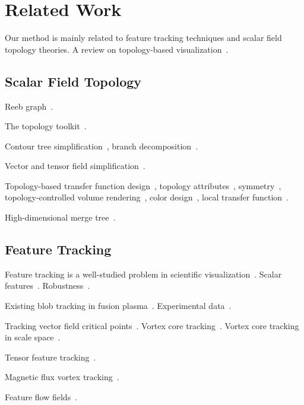 \section{Related Work}
\label{sec:related}

Our method is mainly related to feature tracking techniques and scalar field topology theories.  A review on topology-based visualization~\cite{HeineLHIFSHG16}. 



\subsection{Scalar Field Topology}

Reeb graph~\cite{Reeb1946}.  

The topology toolkit~\cite{TiernyFLGM18}.  

Contour tree simplification~\cite{CarrSP04, KreveldOBPS97}, branch decomposition~\cite{Pascucci2004}.

Vector and tensor field simplification~\cite{TricocheSH00, TricocheSH01a, TricocheSHC01}.  

Topology-based transfer function design~\cite{FujishiroAT99}, topology attributes~\cite{TakeshimaTFN04}, symmetry~\cite{ThomasN11}, topology-controlled volume rendering~\cite{WeberDCPH07}, color design~\cite{ZhouT09}, local transfer function~\cite{GuoY13}.  

High-dimensional merge tree~\cite{OesterlingHWMS17}. 




\subsection{Feature Tracking}

Feature tracking is a well-studied problem in scientific visualization~\cite{PostVHLD2003}.  Scalar features~\cite{SilverW98}.  Robustness~\cite{SkrabaW14}.  

Existing blob tracking in fusion plasma~\cite{WuWSCCSCK16}.  Experimental data~\cite{DavisKMRSZ14}.  

Tracking vector field critical points~\cite{GarthTS04}.  Vortex core tracking~\cite{TheiselSWHS05}.  Vortex core tracking in scale space~\cite{BauerP02}.  

Tensor feature tracking~\cite{TricocheSH01, TricocheWSH02}.  

Magnetic flux vortex tracking~\cite{GuoPPKG16, GuoPG17, PhillipsGPKG16, PhillipsPKG15}.

Feature flow fields~\cite{TheiselS03, WeinkaufTGP11}. 

